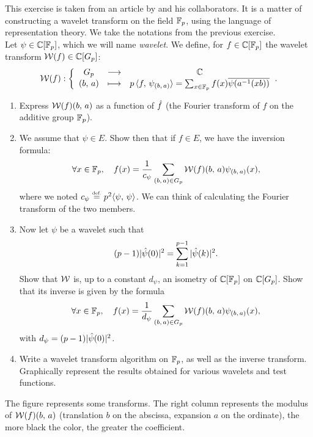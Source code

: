  
\begin{exo}
\label{exo-wavelets-finite-fields}
 
 This exercise is taken from an article by  and his collaborators{\upshape \cite{flornes}}. It is a matter of constructing a wavelet transform on the field $ \mathbb{F}_p $, using the language of representation theory. We take the notations from the previous exercise. \\Let $ \psi \in \mathbb{C} [\mathbb{F}_p] $, which we will name \textit{wavelet}. We define, for $ f \in \mathbb{C} [\mathbb{F}_p] $ the wavelet transform $ \mathcal{W} (f) \in \mathbb{C} [G_p] $:
\begin{equation*}
\mathcal{W} (f): {\left\{ \begin{array}{ccc} G_p & \longrightarrow & \mathbb{C} \\ (b, \, a) & \longmapsto & p \, \langle f,\,\psi_{(b, \, a)}\rangle = \sum_{ x \in \mathbb{F}_p}{f(x) \overline{\psi (a^{-1} (xb))}} \end{array} \right.}.
\end{equation*}
\begin{enumerate}
\item Express $ \mathcal{W} (f) (b, \, a) $ as a function of $ \hat{f} $ (the Fourier transform of $ f $ on the additive group $ \mathbb{F}_p $).
\item We assume that $ \psi \in E $. Show then that if $ f \in E $, we have the inversion formula:
\begin{equation*}
\forall x \in \mathbb{F}_p, \quad f(x) = \frac{1}{c_{\psi}} \sum_{(b, \, a) \in G_p}{\mathcal{W} (f) (b, \, a) \psi_{(b, \, a)} (x)},
\end{equation*}
where we noted $ c_{\psi} \stackrel{\mbox{\upshape\tiny def.}}{=} p^2 \langle \psi,\,\psi\rangle $. We can think of calculating the Fourier transform of the two members.
\item Now let $ \psi $ be a wavelet such that
\begin{equation*}
(p-1) | \hat{\psi} (0) |^2 = \sum_{k = 1}^{p-1}{| \hat{\psi} (k) |^2}.
\end{equation*}
Show that $ \mathcal{W} $ is, up to a constant $ d_{\psi} $, an isometry of $ \mathbb{C} [\mathbb{F}_p] $ on $ \mathbb{C} [G_p] $. Show that its inverse is given by the formula
\begin{equation*}
\forall x \in \mathbb{F}_p, \quad f(x) = \frac{1}{d_{\psi}} \sum_{(b, \, a) \in G_p}{\mathcal{W} (f) (b, \, a) \psi_{(b, \, a)} (x)},
\end{equation*}
with $ d_{\psi} = (p-1) | \hat{\psi} (0) |^2 $.
\item Write a wavelet transform algorithm on $ \mathbb{F}_p $, as well as the inverse transform. Graphically represent the results obtained for various wavelets and test functions.
\end{enumerate}  The figure  represents some transforms. The right column represents the modulus of $ \mathcal{W} (f) (b, \, a) $ (translation $ b $ on the abscissa, expansion $ a $ on the ordinate), the more black the color, the greater the coefficient. 


\end{exo}
